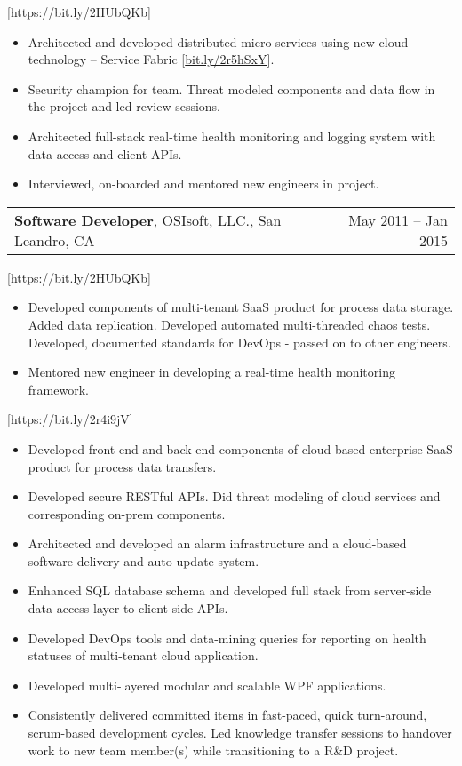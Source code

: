 \documentclass[letterpaper,10pt]{article}
\makeatletter
\newcommand{\experienceItem}[3]{
	\begin{tabular*}{\textwidth}{c@{\extracolsep{\fill}}c}
		\multicolumn{1}{l}{\textbf{#1}, #2} & \multicolumn{1}{r}{#3}\\
	\end{tabular*}\vspace{-10pt}
}
\newcommand{\resumeItemListStart}{\begin{itemize}}
\newcommand{\resumeItemListEnd}{\end{itemize}}
\newcommand{\resumeListItem}[1]{
	\item{#1 \vspace{-6pt}}
}
\makeatother
\begin{document}
	[https://bit.ly/2HUbQKb]
	
	\resumeItemListStart
	\resumeListItem {Architected and developed distributed micro-services using new cloud technology -- Service Fabric [\href{https://bit.ly/2r5hSxY}{bit.ly/2r5hSxY}].}
	\resumeListItem {Security champion for team. Threat modeled components and data flow in the project and led review sessions.}
	\resumeListItem {Architected full-stack real-time health monitoring and logging system with data access and client APIs.}
	\resumeListItem {Interviewed, on-boarded and mentored new engineers in project.}
	\resumeItemListEnd

	\experienceItem{Software Developer}{OSIsoft, LLC., San Leandro, CA}{May 2011 -- Jan 2015}
	
	[https://bit.ly/2HUbQKb]

	\resumeItemListStart
	\resumeListItem {Developed components of multi-tenant SaaS product for process data storage. Added data replication. Developed automated multi-threaded chaos tests. Developed, documented standards for DevOps -  passed on to other engineers.}
	\resumeListItem {Mentored new engineer in developing a real-time health monitoring framework.}
	\resumeItemListEnd

	[https://bit.ly/2r4i9jV]
	
	\resumeItemListStart
	\resumeListItem {Developed front-end and back-end components of cloud-based enterprise SaaS product for process data transfers.}
	\resumeListItem {Developed secure RESTful APIs. Did threat modeling of cloud services and corresponding on-prem components.}
	\resumeListItem {Architected and developed an alarm infrastructure and a cloud-based software delivery and auto-update system.}
	\resumeListItem {Enhanced SQL database schema and developed full stack from server-side data-access layer to client-side APIs.}
	\resumeListItem {Developed DevOps tools and data-mining queries for reporting on health statuses of multi-tenant cloud application.}
	\resumeListItem {Developed multi-layered modular and scalable WPF applications.}
	\resumeListItem {Consistently delivered committed items in fast-paced, quick turn-around, scrum-based development cycles. Led knowledge transfer sessions to handover work to new team member(s) while transitioning to a R\&D project.}
	\resumeItemListEnd

	
\end{document}
